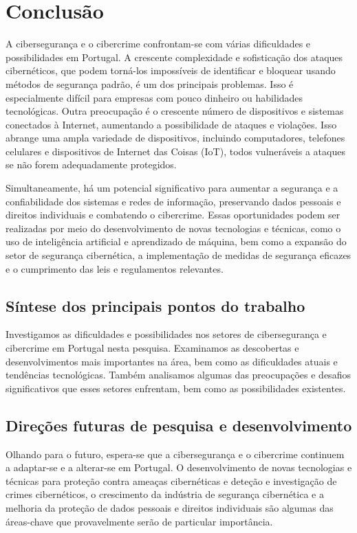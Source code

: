 \chapter{Conclusão}

A cibersegurança e o cibercrime confrontam-se com várias dificuldades e possibilidades em Portugal. A crescente complexidade e sofisticação dos ataques cibernéticos, que podem torná-los impossíveis de identificar e bloquear usando métodos de segurança padrão, é um dos principais problemas. Isso é especialmente difícil para empresas com pouco dinheiro ou habilidades tecnológicas. Outra preocupação é o crescente número de dispositivos e sistemas conectados à Internet, aumentando a possibilidade de ataques e violações. Isso abrange uma ampla variedade de dispositivos, incluindo computadores, telefones celulares e dispositivos de Internet das Coisas (IoT), todos vulneráveis a ataques se não forem adequadamente protegidos.

Simultaneamente, há um potencial significativo para aumentar a segurança e a confiabilidade dos sistemas e redes de informação, preservando dados pessoais e direitos individuais e combatendo o cibercrime. Essas oportunidades podem ser realizadas por meio do desenvolvimento de novas tecnologias e técnicas, como o uso de inteligência artificial e aprendizado de máquina, bem como a expansão do setor de segurança cibernética, a implementação de medidas de segurança eficazes e o cumprimento das leis e regulamentos relevantes.

\section{Síntese dos principais pontos do trabalho}

Investigamos as dificuldades e possibilidades nos setores de cibersegurança e cibercrime em Portugal nesta pesquisa. Examinamos as descobertas e desenvolvimentos mais importantes na área, bem como as dificuldades atuais e tendências tecnológicas. Também analisamos algumas das preocupações e desafios significativos que esses setores enfrentam, bem como as possibilidades existentes.

\section{Direções futuras de pesquisa e desenvolvimento}

Olhando para o futuro, espera-se que a cibersegurança e o cibercrime continuem a adaptar-se e a alterar-se em Portugal. O desenvolvimento de novas tecnologias e técnicas para proteção contra ameaças cibernéticas e deteção e investigação de crimes cibernéticos, o crescimento da indústria de segurança cibernética e a melhoria da proteção de dados pessoais e direitos individuais são algumas das áreas-chave que provavelmente serão de particular importância.


